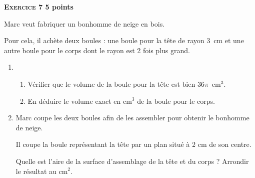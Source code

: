 \textbf{\textsc{Exercice 7} \hfill 5 points}

\medskip
Marc veut fabriquer un bonhomme de neige en bois.

Pour cela, il achète deux boules : une boule pour la tête de rayon 3~cm et
une autre boule pour le corps dont le rayon est 2 fois plus grand.

\medskip

\begin{enumerate}
\item 
	\begin{enumerate}
		\item Vérifier que le volume de la boule pour la tête est bien $36\pi$~cm$^3$.
		\item En déduire le volume exact en cm$^3$ de la boule pour le corps.
	\end{enumerate}
\item Marc coupe les deux boules afin de les assembler pour obtenir le bonhomme de
neige.

Il coupe la boule représentant la tête par un plan situé à 2 cm de son centre.

Quelle est l'aire de la surface d'assemblage de la tête et du corps ? Arrondir le
résultat au cm$^2$.
\end{enumerate}
\vspace{0.25cm}

